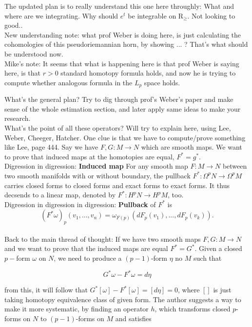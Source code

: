 \documentclass[licencjacka]{pracamgr}
\begin{document}
The updated plan is to really understand this one here throughly:
What and where are we integrating. Why should $e^t$ be integrable 
on $\mathrm{R}_\geq$. Not looking to good.. \\

New understanding note: what prof Weber is doing here, is just calculating the 
cohomologies of this pseudoriemannian horn, by showing ... ? That's what should
be understood now. \\



\scriptsize
Mike's note:
It seems that what is happening here is that prof Weber is saying here,
is that $r>0$ standard homotopy formula holds, and now he is trying
to compute whether analogous formula in the $L_p$ space holds.


What's the general plan? Try to dig through prof's Weber's paper and
make sense of the whole estimation section, and later apply same ideas
to make your research. \\

What's the point of all these operators? Will try to
explain here, using Lee, Weber, Cheeger, Hatcher.  One clue is that we
have to compute/prove something like Lee, page 444.  Say we have $F,G:
M \rightarrow N$ which are smooth maps. We want to prove that induced
maps at the homotopies are equal, $F^\ast = g^\ast$. \\

Digression in digression: \textbf{Induced map} For any smooth map $F:
M \rightarrow N$ between two smooth manifolds with or without
boundary, the pullback $F^\ast: \Omega^p N \rightarrow \Omega^p M$
carries closed forms to closed forms and exact forms to exact
forms. It thus decsends to a linear map, denoted by $F^\ast: H^p N
\rightarrow H^p M$, too. \\

Digression in digression in digression: \textbf{Pullback} of $F^\ast$ is
\[
    (F^\ast \omega)_p(v_1, ..., v_n) =
        \omega_{F(p)}(dF_p(v_1), ..., dF_p(v_k)).
\] \\

Back to the main thread of thought: If we have two smooth maps $F, G:
M \rightarrow N$ and we want to prove that the induced maps are equal
$F^\ast = G^\ast$. Given a closed $p-$form $\omega$ on $N$, we need to
produce a $(p-1)$-form $\eta$ no $M$ such that

\[
    G^\ast \omega - F^\ast \omega = d\eta
\]

from this, it will follow that $ G^\ast [\omega] - F^\ast [\omega] =
[d\eta] = 0$, where $[]$ is just taking homotopy equivalence class
of given form. The author suggests a way to make it more systematic,
by finding an operator $h$, which transforms closed $p$-forms on $N$
to $(p-1)$-forms on $M$ and satisfies
\end{document}
